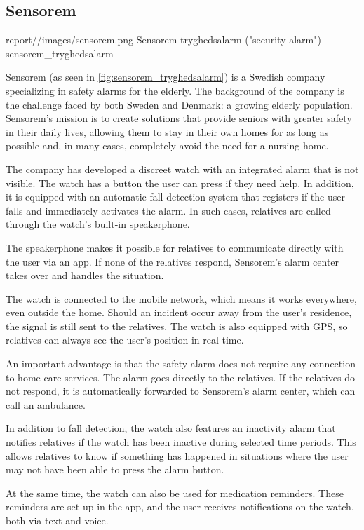 \subsection{Sensorem}


    {report//images/sensorem.png}
    {Sensorem tryghedsalarm ("security alarm")}
    {sensorem_tryghedsalarm}



Sensorem (as seen in \ref{fig:sensorem_tryghedsalarm}) is a Swedish company specializing in safety alarms for the elderly. The background of the company is the challenge faced by both Sweden and Denmark: a growing elderly population. Sensorem’s mission is to create solutions that provide seniors with greater safety in their daily lives, allowing them to stay in their own homes for as long as possible and, in many cases, completely avoid the need for a nursing home.

The company has developed a discreet watch with an integrated alarm that is not visible. The watch has a button the user can press if they need help. In addition, it is equipped with an automatic fall detection system that registers if the user falls and immediately activates the alarm. In such cases, relatives are called through the watch’s built-in speakerphone.

The speakerphone makes it possible for relatives to communicate directly with the user via an app. If none of the relatives respond, Sensorem’s alarm center takes over and handles the situation.

The watch is connected to the mobile network, which means it works everywhere, even outside the home. Should an incident occur away from the user’s residence, the signal is still sent to the relatives. The watch is also equipped with GPS, so relatives can always see the user’s position in real time.

An important advantage is that the safety alarm does not require any connection to home care services. The alarm goes directly to the relatives. If the relatives do not respond, it is automatically forwarded to Sensorem’s alarm center, which can call an ambulance.

In addition to fall detection, the watch also features an inactivity alarm that notifies relatives if the watch has been inactive during selected time periods. This allows relatives to know if something has happened in situations where the user may not have been able to press the alarm button.

At the same time, the watch can also be used for medication reminders. These reminders are set up in the app, and the user receives notifications on the watch, both via text and voice.
